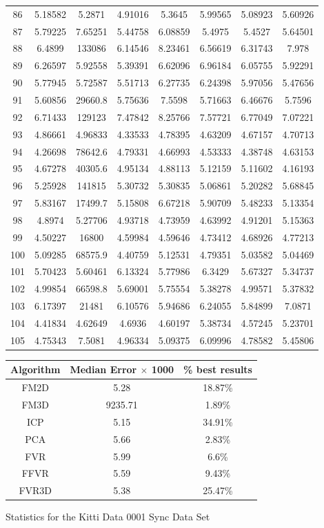\begin{figure}
\begin{tabular}{cccccccc}
86 & 5.18582 & 5.2871 & 4.91016 & 5.3645 & 5.99565 & 5.08923 & 5.60926\\
87 & 5.79225 & 7.65251 & 5.44758 & 6.08859 & 5.4975 & 5.4527 & 5.64501\\
88 & 6.4899 & 133086 & 6.14546 & 8.23461 & 6.56619 & 6.31743 & 7.978\\
89 & 6.26597 & 5.92558 & 5.39391 & 6.62096 & 6.96184 & 6.05755 & 5.92291\\
90 & 5.77945 & 5.72587 & 5.51713 & 6.27735 & 6.24398 & 5.97056 & 5.47656\\
91 & 5.60856 & 29660.8 & 5.75636 & 7.5598 & 5.71663 & 6.46676 & 5.7596\\
92 & 6.71433 & 129123 & 7.47842 & 8.25766 & 7.57721 & 6.77049 & 7.07221\\
93 & 4.86661 & 4.96833 & 4.33533 & 4.78395 & 4.63209 & 4.67157 & 4.70713\\
94 & 4.26698 & 78642.6 & 4.79331 & 4.66993 & 4.53333 & 4.38748 & 4.63153\\
95 & 4.67278 & 40305.6 & 4.95134 & 4.88113 & 5.12159 & 5.11602 & 4.16193\\
96 & 5.25928 & 141815 & 5.30732 & 5.30835 & 5.06861 & 5.20282 & 5.68845\\
97 & 5.83167 & 17499.7 & 5.15808 & 6.67218 & 5.90709 & 5.48233 & 5.13354\\
98 & 4.8974 & 5.27706 & 4.93718 & 4.73959 & 4.63992 & 4.91201 & 5.15363\\
99 & 4.50227 & 16800 & 4.59984 & 4.59646 & 4.73412 & 4.68926 & 4.77213\\
100 & 5.09285 & 68575.9 & 4.40759 & 5.12531 & 4.79351 & 5.03582 & 5.04469\\
101 & 5.70423 & 5.60461 & 6.13324 & 5.77986 & 6.3429 & 5.67327 & 5.34737\\
102 & 4.99854 & 66598.8 & 5.69001 & 5.75554 & 5.38278 & 4.99571 & 5.37832\\
103 & 6.17397 & 21481 & 6.10576 & 5.94686 & 6.24055 & 5.84899 & 7.0871\\
104 & 4.41834 & 4.62649 & 4.6936 & 4.60197 & 5.38734 & 4.57245 & 5.23701\\
105 & 4.75343 & 7.5081 & 4.96334 & 5.09375 & 6.09996 & 4.78582 & 5.45806\\
\end{tabular}
\vspace{10mm}
\centering
\begin{tabular}{ccc}
\hline
\textbf{Algorithm} & \textbf{Median Error $\times$ 1000} & \textbf{\% best results}\\ \hline
FM2D	& 5.28 & 18.87\%\\
FM3D	& 9235.71 & 1.89\%\\
ICP	& 5.15 & 34.91\%\\
PCA	& 5.66 & 2.83\%\\
FVR	& 5.99 & 6.6\%\\
FFVR	& 5.59 & 9.43\%\\
FVR3D	& 5.38 & 25.47\%\\
\end{tabular}
\caption{Statistics for the Kitti Data 0001 Sync Data Set}
\label{tab:kittidata0001sync}
\end{figure} 


